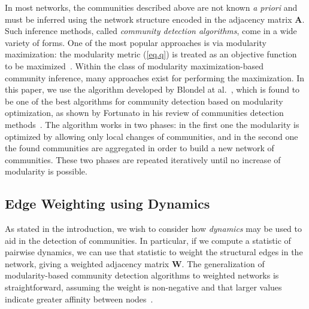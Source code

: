 \documentclass[12pt]{article}
\begin{document}
In most networks, the communities described above are not known \emph{a priori} and must be inferred using the network structure encoded in the adjacency matrix $\textbf{A}$. Such inference methods, called \emph{community detection algorithms}, come in a wide variety of forms. One of the most popular approaches is via modularity maximization: the modularity metric (\ref{eq.q}) is treated as an objective function to be maximized~\cite{newman2004finding}. Within the class of modularity maximization-based community inference, many approaches exist for performing the maximization. In this paper, we use the algorithm developed by Blondel at al\@.~\cite{blondel2008fast}, which is found to be one of the best algorithms for community detection based on modularity 
optimization, as shown by Fortunato in his review of communities detection methods~\cite{fortunato2010community}. 
The algorithm works in two phases: in the first one the modularity is optimized by allowing only local changes of communities, 
and in the second one the found communities are aggregated in order to build a new network of communities. 
These two phases are repeated iteratively until no increase of modularity is possible.

\subsection{Edge Weighting using Dynamics}

As stated in the introduction, we wish to consider how \emph{dynamics} may be used to aid in the detection of communities. In particular, if we compute a statistic of pairwise dynamics, we can use that statistic to weight the structural edges  in the network, giving a weighted adjacency matrix $\mathbf{W}.$ The generalization of modularity-based community detection algorithms to weighted networks is straightforward, assuming the weight is non-negative and that larger values indicate greater affinity between nodes~\cite{newman2004analysis}.
\end{document}
